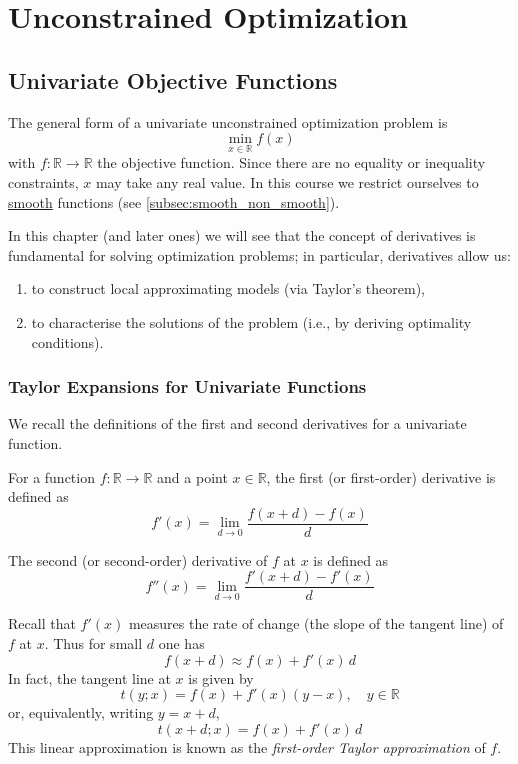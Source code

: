 
\clearpage
\section{Unconstrained Optimization}\label{sec:unconstrained_optimization}

\subsection{Univariate Objective Functions}
The general form of a univariate unconstrained optimization problem is
\[
\min_{x\in\mathbb{R}} f(x)
\]
with \(f:\mathbb{R}\to\mathbb{R}\) the objective function. Since there are no equality or inequality constraints, \(x\) may take any real value. 
In this course we restrict ourselves to \hyperref[subsec:smooth_non_smooth]{smooth} functions (see \ref{subsec:smooth_non_smooth}).

In this chapter (and later ones) we will see that the concept of derivatives is fundamental for solving optimization problems; in particular, derivatives allow us:
\begin{enumerate}
  \item to construct local approximating models (via Taylor's theorem),
  \item to characterise the solutions of the problem (i.e., by deriving optimality conditions).
\end{enumerate}

\subsubsection{Taylor Expansions for Univariate Functions}
We recall the definitions of the first and second derivatives for a univariate function.

\begin{definition}
For a function \(f:\mathbb{R}\to\mathbb{R}\) and a point \(x\in\mathbb{R}\), the first (or first-order) derivative is defined as
\[
f'(x)=\lim_{d\to 0}\frac{f(x+d)-f(x)}{d}
\]
\end{definition}

\begin{definition}
The second (or second-order) derivative of \(f\) at \(x\) is defined as
\[
f''(x)=\lim_{d\to 0}\frac{f'(x+d)-f'(x)}{d}
\]
\end{definition}

Recall that \(f'(x)\) measures the rate of change (the slope of the tangent line) of \(f\) at \(x\). Thus for small \(d\) one has
\[
f(x+d)\approx f(x)+f'(x)\,d
\]
In fact, the tangent line at \(x\) is given by
\[
t(y;x)=f(x)+f'(x)(y-x),\quad y\in\mathbb{R}
\]
or, equivalently, writing \(y=x+d\),
\[
t(x+d;x)=f(x)+f'(x)\,d
\]
This linear approximation is known as the \emph{first-order Taylor approximation} of \(f\).

